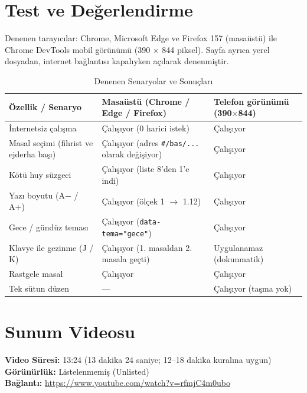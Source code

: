 \documentclass[11pt,a4paper]{article}
\begin{document}
\section{Test ve Değerlendirme}

Denenen tarayıcılar: Chrome, Microsoft Edge ve Firefox 157 (masaüstü) ile Chrome DevTools mobil görünümü (390 $\times$ 844 piksel). Sayfa ayrıca yerel dosyadan, internet bağlantısı kapalıyken açılarak denenmiştir.

\begin{table}[h!]
\centering
\small
\begin{tabularx}{\textwidth}{lXX}
\toprule
\textbf{Özellik / Senaryo} & \textbf{Masaüstü (Chrome / Edge / Firefox)} & \textbf{Telefon görünümü (390$\times$844)} \\
\midrule
İnternetsiz çalışma & Çalışıyor (0 harici istek) & Çalışıyor \\
Masal seçimi (fihrist ve ejderha başı) & Çalışıyor (adres \texttt{\#/bas/...} olarak değişiyor) & Çalışıyor \\
Kötü huy süzgeci & Çalışıyor (liste 8'den 1'e indi) & Çalışıyor \\
Yazı boyutu (A$-$ / A+) & Çalışıyor (ölçek 1 $\rightarrow$ 1.12) & Çalışıyor \\
Gece / gündüz teması & Çalışıyor (\texttt{data-tema="gece"}) & Çalışıyor \\
Klavye ile gezinme (J / K) & Çalışıyor (1. masaldan 2. masala geçti) & Uygulanamaz (dokunmatik) \\
Rastgele masal & Çalışıyor & Çalışıyor \\
Tek sütun düzen & --- & Çalışıyor (taşma yok) \\
\bottomrule
\end{tabularx}
\caption{Denenen Senaryolar ve Sonuçları}
\end{table}

\section{Sunum Videosu}
\textbf{Video Süresi:} 13:24 (13 dakika 24 saniye; 12--18 dakika kuralına uygun)\\
\textbf{Görünürlük:} Listelenmemiş (Unlisted)\\
\textbf{Bağlantı:} \url{https://www.youtube.com/watch?v=rfmjC4m0ubo}
\end{document}
